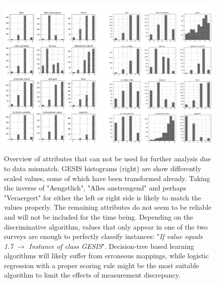 \begin{figure}[ht]
	\begin{center}
		\includegraphics[scale=0.62,angle=0]{fig/histo}
		\label{std}
		\caption{Overview of attributes that can not be used for further analysis due to data mismatch. GESIS histograms (right) are show differently scaled values, some of which have been transformed already. Taking the inverse of "Aengstlich", "Alles anstrengend" and perhaps "Veraergert" for either the left or right side is likely to match the values properly. The remaining attributes do not seem to be reliable and will not be included for the time being. Depending on the discriminative algorithm, values ​​that only appear in one of the two surveys are enough to perfectly classify instances: "\textit{If value equals 1.7  \(\rightarrow\) Instance of class GESIS}". Decision-tree based learning algorithms will likely suffer from erroneous mappings, while logistic regression with a proper scoring rule might be the most suitable algorithm to limit the effects of measurement discrepancy.}
	\end{center}
\end{figure}



